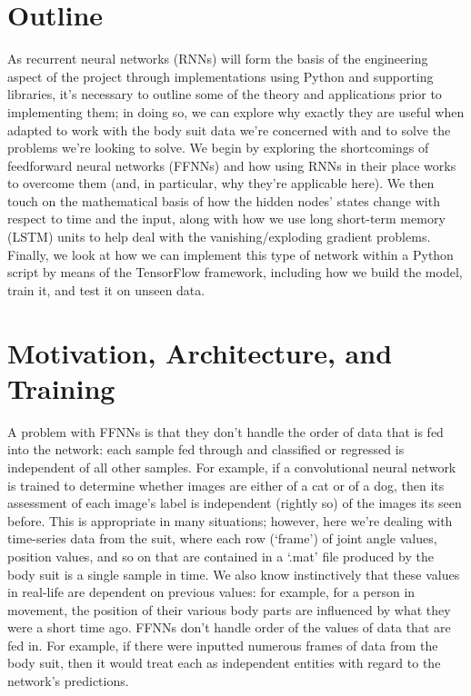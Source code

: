 \documentclass[12pt,twoside]{report}
\begin{document}
\section{Outline}

\quad As recurrent neural networks (RNNs) will form the basis of the engineering aspect of the project through implementations using Python and supporting libraries, it’s necessary to outline some of the theory and applications prior to implementing them; in doing so, we can explore why exactly they are useful when adapted to work with the body suit data we’re concerned with and to solve the problems we’re looking to solve. We begin by exploring the shortcomings of feedforward neural networks (FFNNs) and how using RNNs in their place works to overcome them (and, in particular, why they’re applicable here). We then touch on the mathematical basis of how the hidden nodes’ states change with respect to time and the input, along with how we use long short-term memory (LSTM) units to help deal with the vanishing/exploding gradient problems. Finally, we look at how we can implement this type of network within a Python script by means of the TensorFlow framework, including how we build the model, train it, and test it on unseen data.\\

\section{Motivation, Architecture, and Training}

\quad A problem with FFNNs is that they don’t handle the order of data that is fed into the network: each sample fed through and classified or regressed is independent of all other samples. For example, if a convolutional neural network is trained to determine whether images are either of a cat or of a dog, then its assessment of each image’s label is independent (rightly so) of the images its seen before. This is appropriate in many situations; however, here we’re dealing with time-series data from the suit, where each row (‘frame’) of joint angle values, position values, and so on that are contained in a ‘.mat’ file produced by the body suit is a single sample in time. We also know instinctively that these values in real-life are dependent on previous values: for example, for a person in movement, the position of their various body parts are influenced by what they were a short time ago. FFNNs don’t handle order of the values of data that are fed in. For example, if there were inputted numerous frames of data from the body suit, then it would treat each as independent entities with regard to the network’s predictions.\\
\end{document}
